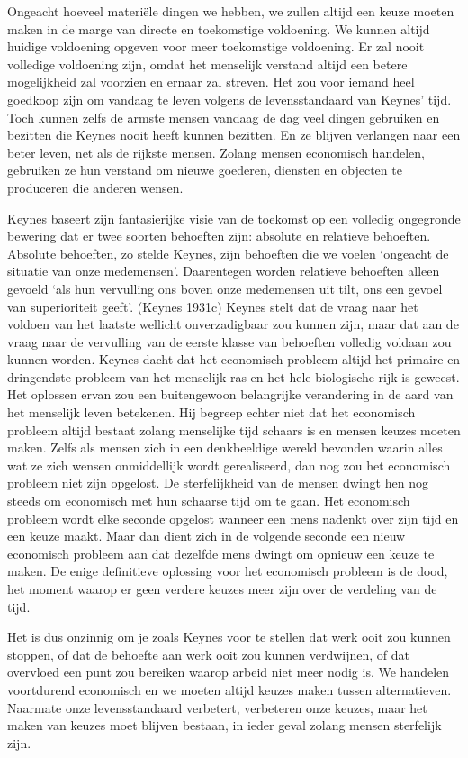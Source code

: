 \documentclass[
  a5paper,
  smalldemyvopaper,11pt,twoside,onecolumn,openright,extrafontsizes,
hidelinks]{memoir}
\begin{document}
Ongeacht hoeveel materiële dingen we hebben, we zullen altijd een keuze
moeten maken in de marge van directe en toekomstige voldoening. We
kunnen altijd huidige voldoening opgeven voor meer toekomstige
voldoening. Er zal nooit volledige voldoening zijn, omdat het menselijk
verstand altijd een betere mogelijkheid zal voorzien en ernaar zal
streven. Het zou voor iemand heel goedkoop zijn om vandaag te leven
volgens de levensstandaard van Keynes' tijd. Toch kunnen zelfs de armste
mensen vandaag de dag veel dingen gebruiken en bezitten die Keynes nooit
heeft kunnen bezitten. En ze blijven verlangen naar een beter leven, net
als de rijkste mensen. Zolang mensen economisch handelen, gebruiken ze
hun verstand om nieuwe goederen, diensten en objecten te produceren die
anderen wensen.

Keynes baseert zijn fantasierijke visie van de toekomst op een volledig
ongegronde bewering dat er twee soorten behoeften zijn: absolute en
relatieve behoeften. Absolute behoeften, zo stelde Keynes, zijn
behoeften die we voelen `ongeacht de situatie van onze medemensen'.
Daarentegen worden relatieve behoeften alleen gevoeld `als hun
vervulling ons boven onze medemensen uit tilt, ons een gevoel van
superioriteit geeft'. (Keynes 1931c) Keynes stelt dat de vraag naar het
voldoen van het laatste wellicht onverzadigbaar zou kunnen zijn, maar
dat aan de vraag naar de vervulling van de eerste klasse van behoeften
volledig voldaan zou kunnen worden. Keynes dacht dat het economisch
probleem altijd het primaire en dringendste probleem van het menselijk
ras en het hele biologische rijk is geweest. Het oplossen ervan zou een
buitengewoon belangrijke verandering in de aard van het menselijk leven
betekenen. Hij begreep echter niet dat het economisch probleem altijd
bestaat zolang menselijke tijd schaars is en mensen keuzes moeten maken.
Zelfs als mensen zich in een denkbeeldige wereld bevonden waarin alles
wat ze zich wensen onmiddellijk wordt gerealiseerd, dan nog zou het
economisch probleem niet zijn opgelost. De sterfelijkheid van de mensen
dwingt hen nog steeds om economisch met hun schaarse tijd om te gaan.
Het economisch probleem wordt elke seconde opgelost wanneer een mens
nadenkt over zijn tijd en een keuze maakt. Maar dan dient zich in de
volgende seconde een nieuw economisch probleem aan dat dezelfde mens
dwingt om opnieuw een keuze te maken. De enige definitieve oplossing
voor het economisch probleem is de dood, het moment waarop er geen
verdere keuzes meer zijn over de verdeling van de tijd.

Het is dus onzinnig om je zoals Keynes voor te stellen dat werk ooit zou
kunnen stoppen, of dat de behoefte aan werk ooit zou kunnen verdwijnen,
of dat overvloed een punt zou bereiken waarop arbeid niet meer nodig is.
We handelen voortdurend economisch en we moeten altijd keuzes maken
tussen alternatieven. Naarmate onze levensstandaard verbetert,
verbeteren onze keuzes, maar het maken van keuzes moet blijven bestaan,
in ieder geval zolang mensen sterfelijk zijn.
\end{document}

